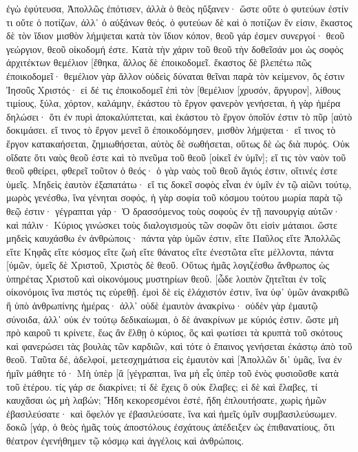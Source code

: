 ἐγὼ ἐφύτευσα, Ἀπολλῶς ἐπότισεν, ἀλλὰ ὁ θεὸς ηὔξανεν· 
ὥστε οὔτε ὁ φυτεύων ἐστίν τι οὔτε ὁ ποτίζων, ἀλλ᾽ ὁ αὐξάνων θεός. 
ὁ φυτεύων δὲ καὶ ὁ ποτίζων ἕν εἰσιν, ἕκαστος δὲ τὸν ἴδιον μισθὸν λήμψεται κατὰ τὸν ἴδιον κόπον, 
θεοῦ γάρ ἐσμεν συνεργοί· θεοῦ γεώργιον, θεοῦ οἰκοδομή ἐστε. 
Κατὰ τὴν χάριν τοῦ θεοῦ τὴν δοθεῖσάν μοι ὡς σοφὸς ἀρχιτέκτων θεμέλιον [ἔθηκα, ἄλλος δὲ ἐποικοδομεῖ. ἕκαστος δὲ βλεπέτω πῶς ἐποικοδομεῖ· 
θεμέλιον γὰρ ἄλλον οὐδεὶς δύναται θεῖναι παρὰ τὸν κείμενον, ὅς ἐστιν Ἰησοῦς Χριστός· 
εἰ δέ τις ἐποικοδομεῖ ἐπὶ τὸν [θεμέλιον [χρυσόν, ἄργυρον], λίθους τιμίους, ξύλα, χόρτον, καλάμην, 
ἑκάστου τὸ ἔργον φανερὸν γενήσεται, ἡ γὰρ ἡμέρα δηλώσει· ὅτι ἐν πυρὶ ἀποκαλύπτεται, καὶ ἑκάστου τὸ ἔργον ὁποῖόν ἐστιν τὸ πῦρ [αὐτὸ δοκιμάσει. 
εἴ τινος τὸ ἔργον μενεῖ ὃ ἐποικοδόμησεν, μισθὸν λήμψεται· 
εἴ τινος τὸ ἔργον κατακαήσεται, ζημιωθήσεται, αὐτὸς δὲ σωθήσεται, οὕτως δὲ ὡς διὰ πυρός. 
Οὐκ οἴδατε ὅτι ναὸς θεοῦ ἐστε καὶ τὸ πνεῦμα τοῦ θεοῦ [οἰκεῖ ἐν ὑμῖν]; 
εἴ τις τὸν ναὸν τοῦ θεοῦ φθείρει, φθερεῖ τοῦτον ὁ θεός· ὁ γὰρ ναὸς τοῦ θεοῦ ἅγιός ἐστιν, οἵτινές ἐστε ὑμεῖς. 
Μηδεὶς ἑαυτὸν ἐξαπατάτω· εἴ τις δοκεῖ σοφὸς εἶναι ἐν ὑμῖν ἐν τῷ αἰῶνι τούτῳ, μωρὸς γενέσθω, ἵνα γένηται σοφός, 
ἡ γὰρ σοφία τοῦ κόσμου τούτου μωρία παρὰ τῷ θεῷ ἐστιν· γέγραπται γάρ· Ὁ δρασσόμενος τοὺς σοφοὺς ἐν τῇ πανουργίᾳ αὐτῶν· 
καὶ πάλιν· Κύριος γινώσκει τοὺς διαλογισμοὺς τῶν σοφῶν ὅτι εἰσὶν μάταιοι. 
ὥστε μηδεὶς καυχάσθω ἐν ἀνθρώποις· πάντα γὰρ ὑμῶν ἐστιν, 
εἴτε Παῦλος εἴτε Ἀπολλῶς εἴτε Κηφᾶς εἴτε κόσμος εἴτε ζωὴ εἴτε θάνατος εἴτε ἐνεστῶτα εἴτε μέλλοντα, πάντα [ὑμῶν, 
ὑμεῖς δὲ Χριστοῦ, Χριστὸς δὲ θεοῦ. 
Οὕτως ἡμᾶς λογιζέσθω ἄνθρωπος ὡς ὑπηρέτας Χριστοῦ καὶ οἰκονόμους μυστηρίων θεοῦ. 
[ὧδε λοιπὸν ζητεῖται ἐν τοῖς οἰκονόμοις ἵνα πιστός τις εὑρεθῇ. 
ἐμοὶ δὲ εἰς ἐλάχιστόν ἐστιν, ἵνα ὑφ᾽ ὑμῶν ἀνακριθῶ ἢ ὑπὸ ἀνθρωπίνης ἡμέρας· ἀλλ᾽ οὐδὲ ἐμαυτὸν ἀνακρίνω· 
οὐδὲν γὰρ ἐμαυτῷ σύνοιδα, ἀλλ᾽ οὐκ ἐν τούτῳ δεδικαίωμαι, ὁ δὲ ἀνακρίνων με κύριός ἐστιν. 
ὥστε μὴ πρὸ καιροῦ τι κρίνετε, ἕως ἂν ἔλθῃ ὁ κύριος, ὃς καὶ φωτίσει τὰ κρυπτὰ τοῦ σκότους καὶ φανερώσει τὰς βουλὰς τῶν καρδιῶν, καὶ τότε ὁ ἔπαινος γενήσεται ἑκάστῳ ἀπὸ τοῦ θεοῦ. 
Ταῦτα δέ, ἀδελφοί, μετεσχημάτισα εἰς ἐμαυτὸν καὶ [Ἀπολλῶν δι᾽ ὑμᾶς, ἵνα ἐν ἡμῖν μάθητε τό· Μὴ ὑπὲρ [ἃ [γέγραπται, ἵνα μὴ εἷς ὑπὲρ τοῦ ἑνὸς φυσιοῦσθε κατὰ τοῦ ἑτέρου. 
τίς γάρ σε διακρίνει; τί δὲ ἔχεις ὃ οὐκ ἔλαβες; εἰ δὲ καὶ ἔλαβες, τί καυχᾶσαι ὡς μὴ λαβών; 
Ἤδη κεκορεσμένοι ἐστέ, ἤδη ἐπλουτήσατε, χωρὶς ἡμῶν ἐβασιλεύσατε· καὶ ὄφελόν γε ἐβασιλεύσατε, ἵνα καὶ ἡμεῖς ὑμῖν συμβασιλεύσωμεν. 
δοκῶ [γάρ, ὁ θεὸς ἡμᾶς τοὺς ἀποστόλους ἐσχάτους ἀπέδειξεν ὡς ἐπιθανατίους, ὅτι θέατρον ἐγενήθημεν τῷ κόσμῳ καὶ ἀγγέλοις καὶ ἀνθρώποις. 
